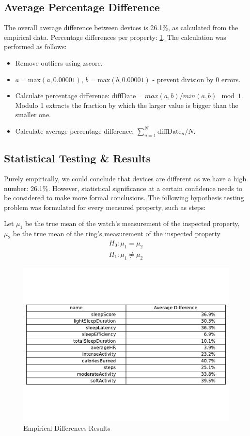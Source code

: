 \subsection{Average Percentage Difference}
The overall average difference between devices is 26.1\%, as calculated from the empirical data. Percentage differences per property: \ref{fig:empirical}. The calculation was performed as follows: 
\begin{itemize}
    \item Remove outliers using zscore.
    \item $a = \text{max}(a, 0.00001)$, $b = \text{max}(b, 0.00001)$ - prevent division by 0 errors.
    \item Calculate percentage difference: $\text{diffDate} = max(a,b) / min(a,b) \mod 1$. Modulo 1 extracts the fraction by which the larger value is bigger than the smaller one.
    \item Calculate average percentage difference: $\sum_{n=1}^{N} \text{diffDate}_n / N$.
\end{itemize}
\subsection{Statistical Testing \& Results}
Purely empirically, we could conclude that devices are different as we have a high number: 26.1\%. However, statistical significance at a certain confidence needs to be considered to make more formal conclusions. The following hypothesis testing problem was formulated for every measured property, such as steps: 

Let $\mu_1$ be the true mean of the watch's measurement of the inspected property, $\mu_2$ be the true mean of the ring's measurement of the inspected property
\begin{align*}
    H_0:\mu_1 = \mu_2 \\
    H_1: \mu_1 \neq \mu_2
\end{align*}
\begin{figure}
    
    \centering
    \includegraphics[width=\textwidth,keepaspectratio]{../images/empiricalResults.pdf}
    \caption{Empirical Differences Results}
    \label{fig:empirical}
    
\end{figure}

